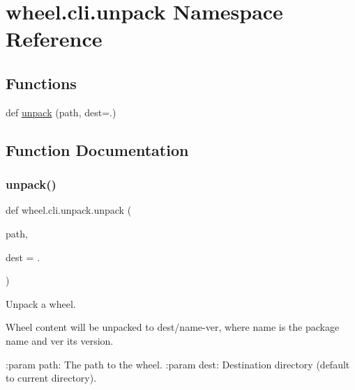 \hypertarget{namespacewheel_1_1cli_1_1unpack}{}\section{wheel.\+cli.\+unpack Namespace Reference}
\label{namespacewheel_1_1cli_1_1unpack}
\subsection*{Functions}
\begin{DoxyCompactItemize}
\item 
def \hyperlink{namespacewheel_1_1cli_1_1unpack_a719a5144281c0d6fcd407b6966a248f5}{unpack} (path, dest=\textquotesingle{}.\textquotesingle{})
\end{DoxyCompactItemize}


\subsection{Function Documentation}
\mbox{\label{namespacewheel_1_1cli_1_1unpack_a719a5144281c0d6fcd407b6966a248f5}} 
\subsubsection{\texorpdfstring{unpack()}{unpack()}}
{\footnotesize\ttfamily def wheel.\+cli.\+unpack.\+unpack (\begin{DoxyParamCaption}\item[{}]{path,  }\item[{}]{dest = {\ttfamily \textquotesingle{}.\textquotesingle{}} }\end{DoxyParamCaption})}

\begin{DoxyVerb}Unpack a wheel.

Wheel content will be unpacked to {dest}/{name}-{ver}, where {name}
is the package name and {ver} its version.

:param path: The path to the wheel.
:param dest: Destination directory (default to current directory).
\end{DoxyVerb}
 